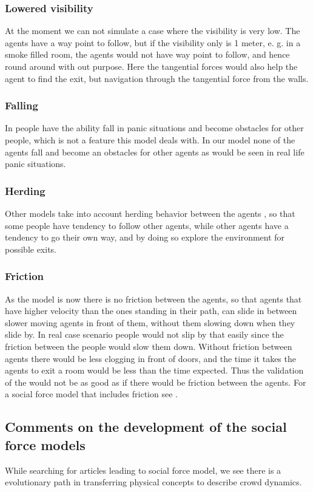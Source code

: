 \subsubsection{Lowered visibility}
At the moment we can not simulate a case where the visibility is very low. The 
agents have a way point to follow, but if the visibility only is 1 meter, e. 
g. in a smoke filled room, the  agents would not have way point to follow, and 
hence round around with out purpose. Here the tangential forces would also 
help the agent to find the exit, but navigation through the tangential force 
from the walls.

\subsubsection{Falling}
In \cite{HiDAC} people have the ability fall in panic situations and become 
obstacles for other people, which is not a feature this model deals with. In 
our model none of the agents fall and become an obstacles for other agents as 
would be seen in real life panic situations.

\subsubsection{Herding}
Other models take into account herding behavior between the agents  
\cite{helbing00}, so that some people have tendency to follow other agents, 
while other agents have a tendency to go their own way,  and by doing so 
explore the environment for possible exits.

\subsubsection{Friction}
As the model is now there is no friction between the agents, so that agents 
that have higher velocity than the ones standing in their path, can slide in 
between slower moving agents in front of them, without them slowing down when 
they slide by. In real case scenario people would not slip by that easily 
since the friction between the people would slow them down.  Without friction 
between agents there would be less clogging in front of doors, and the time it 
takes the agents to exit a room would be less than the time expected. Thus the 
validation of the would not be as good as if there would be friction between 
the agents. For a social force model that includes friction see \cite{HelbingNew}.

\subsection{Comments on the development of the social force models}
\label{subsec:development}
While searching for articles leading to social force model, we see there is a 
evolutionary path in transferring physical concepts to describe crowd dynamics.


